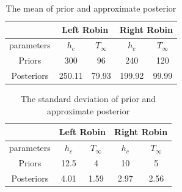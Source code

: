 \documentclass[review]{elsarticle}
\begin{document}
\begin{table}[]
    \centering
    \caption{The mean of prior and approximate posterior }
    \begin{tabular}{c c c c c}
        \hline
          &  \multicolumn{2}{c}{ Left Robin } & \multicolumn{2}{c}{Right Robin } \\
         \hline
         parameters &  $h_c$ & $T_\infty$ & $h_c$ & $T_\infty$ \\
         Priors  &  300 & 96 & 240 & 120 \\
         Posteriors  &  250.11 & 79.93 & 199.92 & 99.99 \\
         \hline
    \end{tabular}
    \label{tab:case-post-mean}
\end{table}

\begin{table}[]
    \centering
    \caption{The standard deviation of prior and approximate posterior }
    \begin{tabular}{c c c c c}
        \hline
          &  \multicolumn{2}{c}{ Left Robin } & \multicolumn{2}{c}{Right Robin } \\
         \hline
         parameters &  $h_c$ & $T_\infty$ & $h_c$ & $T_\infty$ \\
         Priors  &  12.5 & 4 & 10 & 5 \\
         Posteriors  & 4.01 & 1.59 & 2.97 & 2.56 \\
         \hline
    \end{tabular}
    \label{tab:case-post-std}
\end{table}
\end{document}
